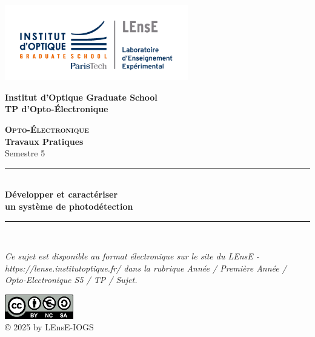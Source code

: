 \documentclass[a4paper,11pt,twoside]{book} %
\begin{document}
\begin{titlepage}

\begin{center}
	\begin{minipage}{2.5cm}
	\begin{center}
		\includegraphics[width=8cm]{images/Logo-LEnsE.png}
	\end{center}
\end{minipage}\hfill
\begin{minipage}{10cm}
	\begin{center}
	\textbf{Institut d'Optique Graduate School }\\[0.1cm]
    \textbf{TP d'Opto-Électronique}


	\end{center}
\end{minipage}\hfill


\vspace{4cm}


{\huge \bfseries \textsc{Opto-Électronique}} \\[0.5cm]
{\large \bfseries Travaux Pratiques} \\[0.2cm]
Semestre 5

\vspace{2cm}
\rule{\linewidth}{0.3mm} \\[0.4cm]
{ \huge \bfseries\color{violet_iogs} Développer et caractériser \\ un système de photodétection \\[0.4cm] }
\rule{\linewidth}{0.3mm} \\[1cm]

\vspace{4cm}


\textit{Ce sujet est disponible au format électronique sur le site du LEnsE - https://lense.institutoptique.fr/ dans la rubrique Année / Première Année / Opto-Electronique S5 / TP / Sujet.}

\vspace{1cm}

\begin{minipage}{5cm}
\begin{center}
\includegraphics[width=3cm]{./images/logocc}\\
\small
  © 2025 by LEnsE-IOGS 
\end{center}
\end{minipage}

\end{center}
\end{titlepage}
\end{document}
